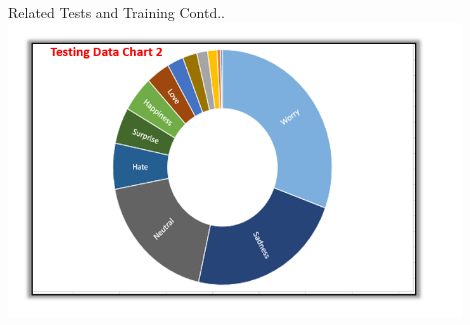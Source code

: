 \documentclass{beamer}
\begin{document}
 \begin {frame}{Related Tests and Training Contd..}
 \centering
        \includegraphics[width=0.9\textwidth]{10001.PNG}
    \endleft
   \end {frame}
\end{document}

